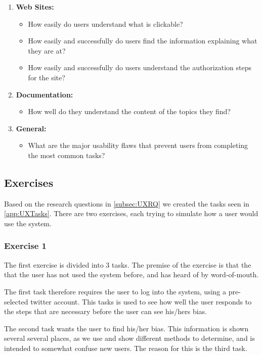 \begin{enumerate}
  \item \textbf{Web Sites:} 
	\begin{itemize}
      \item How easily do users understand what is clickable?
      \item How easily and successfully do users find the information
      explaining what they are at?
      \item How easily and successfully do users understand the authorization
      steps for the site?
    \end{itemize}
  \item \textbf{Documentation:}
    \begin{itemize}
      \item How well do they understand the content of the topics they find?
    \end{itemize}
  \item \textbf{General:}
    \begin{itemize}
      \item What are the major usability flaws that prevent users from
      completing the most common tasks?
    \end{itemize}
\end{enumerate}

\subsection{Exercises}
Based on the research questions in \autoref{subsec:UXRQ} we created the tasks
seen in \autoref{app:UXTasks}. There are two exercises, each trying to simulate
how a user would use the system.\nl

\subsubsection{Exercise 1}\label{subsub:UXE1}
The first exercise is divided into 3 tasks. The premise of the exercise is that
the that the user has not used the system before, and has heard of by
word-of-mouth.\nl

The first task therefore requires the user to log into the system, using a
pre-selected twitter account. This tasks is used to see how well the user
responds to the steps that are necessary before the user can see his/hers
bias.\nl

The second task wants the user to find his/her bias. This information is shown
several several places, as we use and show different methods to determine, and
is intended to somewhat confuse new users. The reason for this is the third
task.\nl

